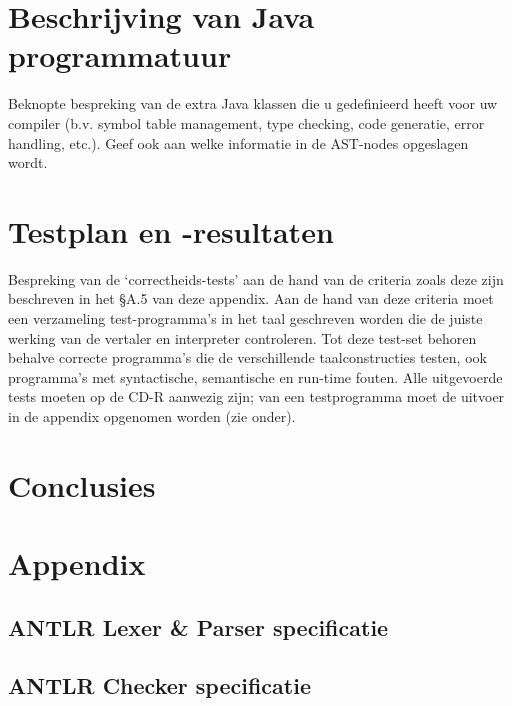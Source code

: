 \documentclass[]{article}
\begin{document}
\newpage
\section{Beschrijving van Java programmatuur}
Beknopte bespreking van de extra Java klassen die
u gedefinieerd heeft voor uw compiler (b.v. symbol table management, type checking, code
generatie, error handling, etc.). Geef ook aan welke informatie in de AST-nodes opgeslagen
wordt.

\newpage
\section{Testplan en -resultaten}
Bespreking van de ‘correctheids-tests’ aan de hand van de criteria
zoals deze zijn beschreven in het §A.5 van deze appendix. Aan de hand van deze criteria moet
een verzameling test-programma’s in het taal geschreven worden die de juiste werking van de
vertaler en interpreter controleren. Tot deze test-set behoren behalve correcte programma’s
die de verschillende taalconstructies testen, ook programma’s met syntactische, semantische
en run-time fouten.
Alle uitgevoerde tests moeten op de CD-R aanwezig zijn; van een testprogramma moet de
uitvoer in de appendix opgenomen worden (zie onder).

\newpage
\section{Conclusies}



\newpage
\section{Appendix}

\subsection{ANTLR Lexer \& Parser specificatie}



\newpage
\subsection{ANTLR Checker specificatie}

\end{document}
